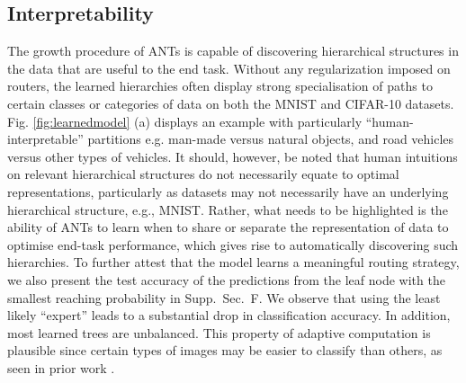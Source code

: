 \subsection{Interpretability}
The growth procedure of ANTs is capable of discovering hierarchical structures in the data that are useful to the end task. Without any regularization imposed on routers, the learned hierarchies often display strong specialisation of paths to certain classes or categories of data on both the MNIST and CIFAR-10 datasets. Fig. \ref{fig:learnedmodel} (a) displays an example with particularly ``human-interpretable'' partitions e.g. man-made versus natural objects, and road vehicles versus other types of vehicles. It should, however, be noted that human intuitions on relevant hierarchical structures do not necessarily equate to optimal representations, particularly as datasets may not necessarily have an underlying hierarchical structure, e.g., MNIST. Rather, what needs to be highlighted is the ability of ANTs to learn when to share or separate the representation of data to optimise end-task performance, which gives rise to automatically discovering such hierarchies. To further attest that the model learns a meaningful routing strategy, we also present the test accuracy of the predictions from the leaf node with the smallest reaching probability in Supp.~Sec.~F. We observe that using the least likely ``expert'' leads to a substantial drop in classification accuracy. In addition, most learned trees are unbalanced. This property of adaptive computation is plausible since certain types of images may be easier to classify than others, as seen in prior work \cite{Figurnov2017SpatiallyAC}.

